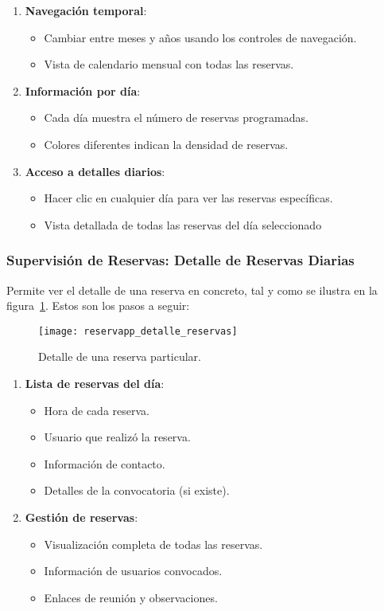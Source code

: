 \begin{enumerate}
   \item \textbf{Navegación temporal}:
   \begin{itemize}
      \item Cambiar entre meses y años usando los controles de navegación.
	  \item Vista de calendario mensual con todas las reservas.
   \end{itemize}
   \item \textbf{Información por día}:
   \begin{itemize}
      \item Cada día muestra el número de reservas programadas.
      \item Colores diferentes indican la densidad de reservas.
   \end{itemize}
   \item \textbf{Acceso a detalles diarios}:
   \begin{itemize}
      \item Hacer clic en cualquier día para ver las reservas específicas.
	  \item Vista detallada de todas las reservas del día seleccionado
   \end{itemize}
\end{enumerate}

\subsubsection{Supervisión de Reservas: Detalle de Reservas Diarias}
Permite ver el detalle de una reserva en concreto, tal y como se ilustra en la figura~\ref{fig:reservapp_detalle_reservas}. Estos son los pasos a seguir:

\begin{figure}[H]
	\centering
		\texttt{[image: reservapp\_detalle\_reservas]}
	\caption{Detalle de una reserva particular.}
	\label{fig:reservapp_detalle_reservas}
\end{figure}

\begin{enumerate}
   \item \textbf{Lista de reservas del día}:
   \begin{itemize}
      \item Hora de cada reserva.
      \item Usuario que realizó la reserva.
      \item Información de contacto.
      \item Detalles de la convocatoria (si existe).
   \end{itemize}
   \item \textbf{Gestión de reservas}:
   \begin{itemize}
      \item Visualización completa de todas las reservas.
      \item Información de usuarios convocados.
      \item Enlaces de reunión y observaciones.
   \end{itemize}
\end{enumerate}

